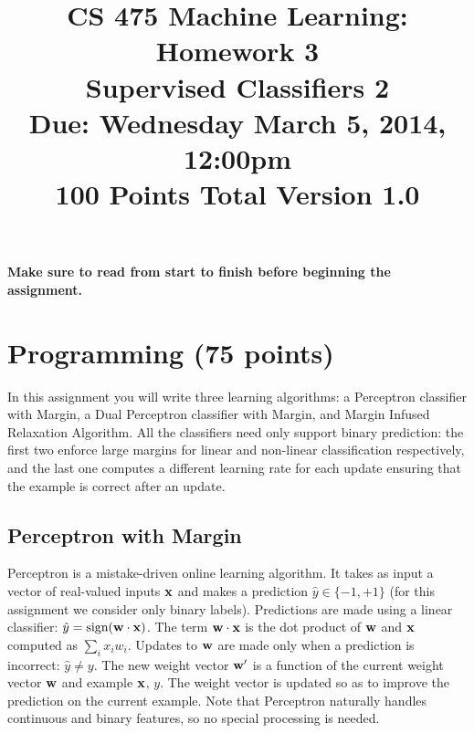 \documentclass[11pt]{article}
\title{CS 475 Machine Learning: Homework 3\\Supervised Classifiers 2\\
\Large{Due: Wednesday March 5, 2014, 12:00pm}\\
100 Points Total \hspace{1cm} Version 1.0}
\author{}
\date{}
\newcommand{\vw}{{\bf w}}
\newcommand{\vx}{{\bf x}}
\newcommand{\yh}{\hat{y}}
\begin{document}
\large
\maketitle
\thispagestyle{headings}

\vspace{-.5in}

{\bf Make sure to read from start to finish before beginning the assignment.}
\section{Programming (75 points)}
In this assignment you will write three learning algorithms: a Perceptron classifier with Margin, a Dual Perceptron classifier with Margin, and Margin Infused Relaxation Algorithm. All the classifiers need only support binary prediction: the first two enforce large margins for linear and non-linear classification respectively, and the last one computes a different learning rate for each update ensuring that the example is correct after an update.

\subsection{Perceptron with Margin}
Perceptron is a mistake-driven online learning algorithm. It takes as input a vector of real-valued inputs $\vx$ and makes a prediction $\yh \in \{-1,+1\}$ (for this assignment we consider only binary labels). Predictions are made using a linear classifier: $\yh = \textrm{sign}(\vw \cdot \vx)$. The term $\vw \cdot \vx$ is the dot product of $\vw$ and $\vx$ computed as $\sum_i x_i  w_i$. Updates to $\vw$ are made only when a prediction is incorrect: $\yh \ne y$. The new weight vector $\vw'$ is a function of the current weight vector $\vw$ and example $\vx$, $y$. The weight vector is updated so as to improve the prediction on the current example. Note that Perceptron naturally handles continuous and binary features, so no special processing is needed.
\end{document}
